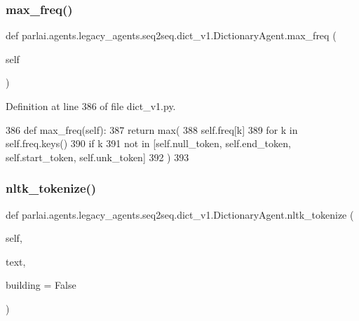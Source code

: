 \subsubsection{\texorpdfstring{max\+\_\+freq()}{max\_freq()}}
{\footnotesize\ttfamily def parlai.\+agents.\+legacy\+\_\+agents.\+seq2seq.\+dict\+\_\+v1.\+Dictionary\+Agent.\+max\+\_\+freq (\begin{DoxyParamCaption}\item[{}]{self }\end{DoxyParamCaption})}



Definition at line 386 of file dict\+\_\+v1.\+py.


\begin{DoxyCode}
386     \textcolor{keyword}{def }max\_freq(self):
387         \textcolor{keywordflow}{return} max(
388             self.freq[k]
389             \textcolor{keywordflow}{for} k \textcolor{keywordflow}{in} self.freq.keys()
390             \textcolor{keywordflow}{if} k
391             \textcolor{keywordflow}{not} \textcolor{keywordflow}{in} [self.null\_token, self.end\_token, self.start\_token, self.unk\_token]
392         )
393 
\end{DoxyCode}
\mbox{\label{classparlai_1_1agents_1_1legacy__agents_1_1seq2seq_1_1dict__v1_1_1DictionaryAgent_a63a722c3a9b9ff68a06479e2e6539fd8}} 
\subsubsection{\texorpdfstring{nltk\+\_\+tokenize()}{nltk\_tokenize()}}
{\footnotesize\ttfamily def parlai.\+agents.\+legacy\+\_\+agents.\+seq2seq.\+dict\+\_\+v1.\+Dictionary\+Agent.\+nltk\+\_\+tokenize (\begin{DoxyParamCaption}\item[{}]{self,  }\item[{}]{text,  }\item[{}]{building = {\ttfamily False} }\end{DoxyParamCaption})}

